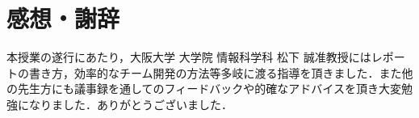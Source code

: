 \documentclass[a4j, titlepage]{jarticle}
\begin{document}
\section{感想・謝辞}
本授業の遂行にあたり，大阪大学 大学院 情報科学科 松下 誠准教授にはレポートの書き方，効率的なチーム開発の方法等多岐に渡る指導を頂きました．また他の先生方にも議事録を通してのフィードバックや的確なアドバイスを頂き大変勉強になりました．ありがとうございました．
\end{document}
